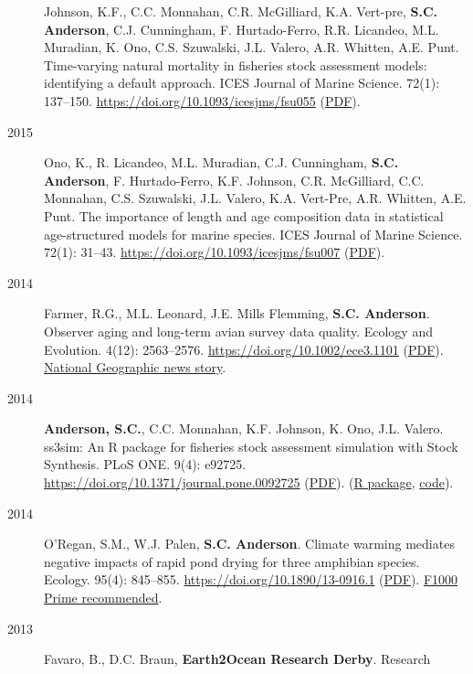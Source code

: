 \begin{description}
Johnson, K.F., C.C. Monnahan, C.R. McGilliard, K.A. Vert-pre,
\textbf{S.C. Anderson}, C.J. Cunningham, F. Hurtado-Ferro, R.R.
Licandeo, M.L. Muradian, K. Ono, C.S. Szuwalski, J.L. Valero, A.R.
Whitten, A.E. Punt. Time-varying natural mortality in fisheries stock
assessment models: identifying a default approach. ICES Journal of
Marine Science. 72(1): 137--150.
\url{https://doi.org/10.1093/icesjms/fsu055}
(\href{http://icesjms.oxfordjournals.org/content/early/2014/04/09/icesjms.fsu055.full.pdf?keytype=ref\&ijkey=NEXmZIkz3289u3z}{PDF}).
\item[2015]
Ono, K., R. Licandeo, M.L. Muradian, C.J. Cunningham, \textbf{S.C.
Anderson}, F. Hurtado-Ferro, K.F. Johnson, C.R. McGilliard, C.C.
Monnahan, C.S. Szuwalski, J.L. Valero, K.A. Vert-Pre, A.R. Whitten, A.E.
Punt. The importance of length and age composition data in statistical
age-structured models for marine species. ICES Journal of Marine
Science. 72(1): 31--43. \url{https://doi.org/10.1093/icesjms/fsu007}
(\href{http://icesjms.oxfordjournals.org/content/early/2014/02/20/icesjms.fsu007.full.pdf}{PDF}).
\item[2014]
Farmer, R.G., M.L. Leonard, J.E. Mills Flemming, \textbf{S.C. Anderson}.
Observer aging and long-term avian survey data quality. Ecology and
Evolution. 4(12): 2563--2576. \url{https://doi.org/10.1002/ece3.1101}
(\href{http://onlinelibrary.wiley.com/doi/10.1002/ece3.1101/pdf}{PDF}).
\href{http://news.nationalgeographic.com/news/2014/08/140805-aging-birders-breeding-bird-survey-volunteers-science/}{National
Geographic news story}.
\item[2014]
\textbf{Anderson, S.C.}, C.C. Monnahan, K.F. Johnson, K. Ono, J.L.
Valero. ss3sim: An R package for fisheries stock assessment simulation
with Stock Synthesis. PLoS ONE. 9(4): e92725.
\url{https://doi.org/10.1371/journal.pone.0092725}
(\href{http://www.plosone.org/article/fetchObject.action?uri=info\%3Adoi\%2F10.1371\%2Fjournal.pone.0092725\&representation=PDF}{PDF}).
(\href{http://cran.r-project.org/web/packages/ss3sim/index.html}{R
package}, \href{https://github.com/ss3sim/ss3sim}{code}).
\item[2014]
O'Regan, S.M., W.J. Palen, \textbf{S.C. Anderson}. Climate warming
mediates negative impacts of rapid pond drying for three amphibian
species. Ecology. 95(4): 845--855.
\url{https://doi.org/10.1890/13-0916.1}
(\href{http://onlinelibrary.wiley.com/doi/10.1890/13-0916.1/epdf}{PDF}).
\href{https://facultyopinions.com/prime/718498042}{F1000 Prime
recommended}.
\item[2013]
Favaro, B., D.C. Braun, \textbf{Earth2Ocean Research Derby}. Research

\end{description}
